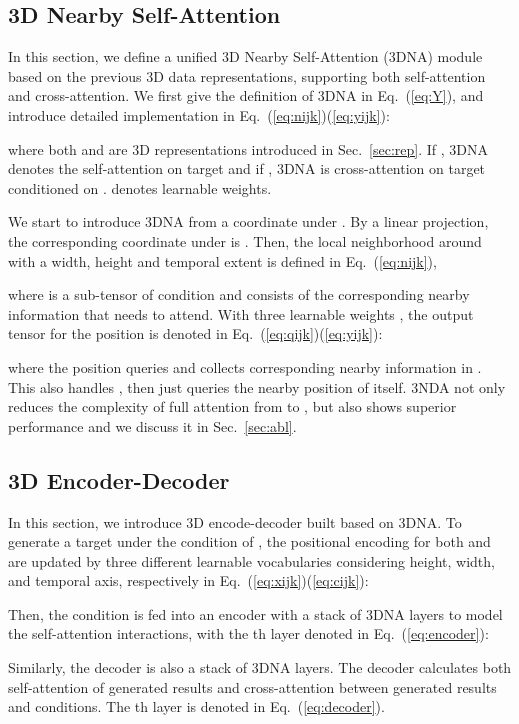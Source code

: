 \documentclass[10pt,twocolumn,letterpaper]{article}
\begin{document}
\subsection{3D Nearby Self-Attention}\label{sec:nearby}
In this section, we define a unified 3D Nearby Self-Attention (3DNA) module based on the previous 3D data representations, supporting both self-attention and cross-attention. We first give the definition of 3DNA in Eq.~(\ref{eq:Y}), and introduce detailed implementation in Eq.~(\ref{eq:nijk})(\ref{eq:yijk}):

where both  and  are 3D representations introduced in Sec.~\ref{sec:rep}. If , 3DNA denotes the self-attention on target  and if  , 3DNA is cross-attention on target  conditioned on .  denotes learnable weights.

We start to introduce 3DNA from a coordinate  under . By a linear projection, the corresponding coordinate  under  is . Then, the local neighborhood around  with a width, height and temporal extent  is defined in Eq.~(\ref{eq:nijk}),
\begin{small}

\end{small}
where  is a sub-tensor of condition  and consists of the corresponding nearby information that  needs to attend. With three learnable weights , the output tensor for the position  is denoted in Eq.~(\ref{eq:qijk})(\ref{eq:yijk}):
  
where the  position queries and collects corresponding nearby information in . This also handles , then  just queries the nearby position of itself. 3NDA not only reduces the complexity of full attention from  to ,  but also shows superior performance and we discuss it in Sec.~\ref{sec:abl}.

\subsection{3D Encoder-Decoder} \label{sec:ed}
In this section, we introduce 3D encode-decoder built based on 3DNA. To generate a target  under the condition of , the positional encoding for both  and  are updated by three different learnable vocabularies considering height, width, and temporal axis, respectively in Eq.~(\ref{eq:xijk})(\ref{eq:cijk}): 
  
Then, the condition  is fed into an encoder with a stack of  3DNA layers to model the self-attention interactions, with the th layer denoted in Eq.~(\ref{eq:encoder}):

Similarly, the decoder is also a stack of  3DNA layers. The decoder calculates both self-attention of generated results and cross-attention between generated results and conditions. The th layer is denoted in Eq.~(\ref{eq:decoder}).
\end{document}
